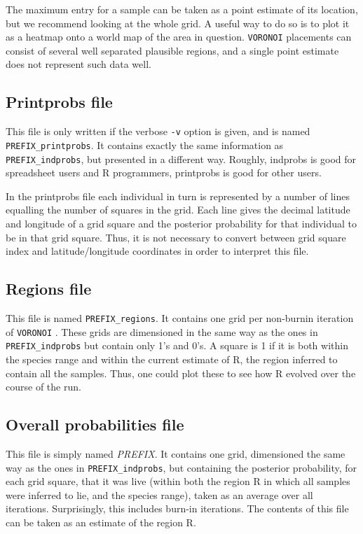 \documentclass[10pt,titlepage,times,letterpaper]{article}
\def\VORONOI{{\tt VORONOI} }
\begin{document}
The maximum entry for a sample can be taken as a point estimate of its location, but
we recommend looking at the whole grid.  A useful way to do so is to plot it as a heatmap
onto a world map of the area in question.  \VORONOI placements can consist of several
well separated plausible regions, and a single point estimate does not represent
such data well.

\subsection{Printprobs file}

This file is only written if the verbose {\tt -v} option is given, and is named
{\tt PREFIX\_printprobs}.  It contains exactly the same information as 
{\tt PREFIX\_indprobs}, but presented in a different way.  Roughly, indprobs is good for
spreadsheet users and R programmers, printprobs is good for other users.

In the printprobs file each individual in turn is represented by a number of lines
equalling the number of squares in the grid.  Each line gives the decimal latitude and 
longitude of a grid square and the posterior probability for that individual to be
in that grid square.  Thus, it is not necessary to convert between grid square
index and latitude/longitude coordinates in order to interpret this file.

\subsection{Regions file}

This file is named {\tt PREFIX\_regions}.  It contains one grid per non-burnin
iteration of \VORONOI.  These grids are dimensioned in the same way as the ones in
{\tt PREFIX\_indprobs} but contain only 1's and 0's.  A square is 1 if it is both within
the species range and within the current estimate of R, the region inferred to contain all
the samples.  Thus, one could plot these to see how 
R evolved over the course of the run.

\subsection{Overall probabilities file}

This file is simply named {\it PREFIX}.  It contains one grid, dimensioned the same
way as the ones in {\tt PREFIX\_indprobs}, but containing the posterior probability, for
each grid square, that it was live (within both the region R in which all samples were
inferred to lie, and the species range), taken as an average over all iterations.  
Surprisingly, this includes burn-in iterations.  The contents of this file can be taken
as an estimate of the region R.  
\end{document}
